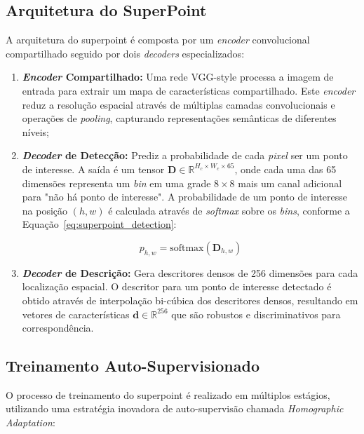 \subsection*{Arquitetura do SuperPoint}

A arquitetura do \gls{superpoint} é composta por um \textit{encoder} convolucional compartilhado seguido por dois \textit{decoders} especializados:

\begin{enumerate}
    \item \textbf{\textit{Encoder} Compartilhado:} Uma rede VGG-style processa a imagem de entrada para extrair um mapa de características compartilhado. Este \textit{encoder} reduz a resolução espacial através de múltiplas camadas convolucionais e operações de \textit{pooling}, capturando representações semânticas de diferentes níveis;
    
    \item \textbf{\textit{Decoder} de Detecção:} Prediz a probabilidade de cada \textit{pixel} ser um ponto de interesse. A saída é um tensor $\mathbf{D} \in \mathbb{R}^{H_c \times W_c \times 65}$, onde cada uma das 65 dimensões representa um \textit{bin} em uma grade $8 \times 8$ mais um canal adicional para "não há ponto de interesse". A probabilidade de um ponto de interesse na posição $(h, w)$ é calculada através de \textit{softmax} sobre os \textit{bins}, conforme a Equação~\ref{eq:superpoint_detection}:
    
    \begin{equation}
    \label{eq:superpoint_detection}
    p_{h,w} = \text{softmax}(\mathbf{D}_{h,w})
    \end{equation}
    
    \item \textbf{\textit{Decoder} de Descrição:} Gera descritores densos de 256 dimensões para cada localização espacial. O descritor para um ponto de interesse detectado é obtido através de interpolação bi-cúbica dos descritores densos, resultando em vetores de características $\mathbf{d} \in \mathbb{R}^{256}$ que são robustos e discriminativos para correspondência.
\end{enumerate}

\subsection*{Treinamento Auto-Supervisionado}

O processo de treinamento do \gls{superpoint} é realizado em múltiplos estágios, utilizando uma estratégia inovadora de auto-supervisão chamada \textit{Homographic Adaptation}:

